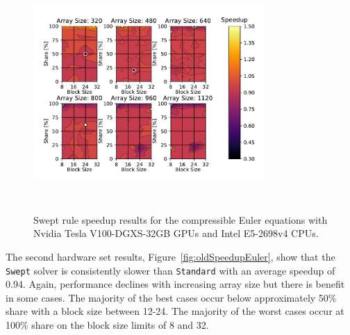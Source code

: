 \documentclass[preprints,article,accept,moreauthors,pdftex]{Definitions/mdpi}
\def\Swept{\texttt{Swept}}
\def\Standard{\texttt{Standard}}
\def\newCPU{Intel E5-2698v4} %
\def\newGPU{Nvidia Tesla V100-DGXS-32GB}
\begin{document}
\begin{figure}[H]
    
    \begin{center}
        \includegraphics[height=9cm,width=0.78\textwidth, trim={0.75cm 0.4cm 0.8cm 0.7cm},clip]{figs/speedUpeulerNew.pdf}
        \caption{Swept rule speedup results  for the compressible Euler equations with \newGPU{} GPUs and \newCPU{} CPUs.}
        \label{fig:newSpeedupEuler}
    \end{center}
\end{figure}




The second hardware set results, Figure~\ref{fig:oldSpeedupEuler}, show that the \Swept{} solver is consistently slower than \Standard{} with an average speedup of 0.94. Again, performance declines with increasing array size but there is benefit in some cases. The majority of the best cases occur below approximately 50\% share with a block size between 12-24. The majority of the worst cases occur at 100\% share on the block size limits of 8 and 32.
\end{document}
